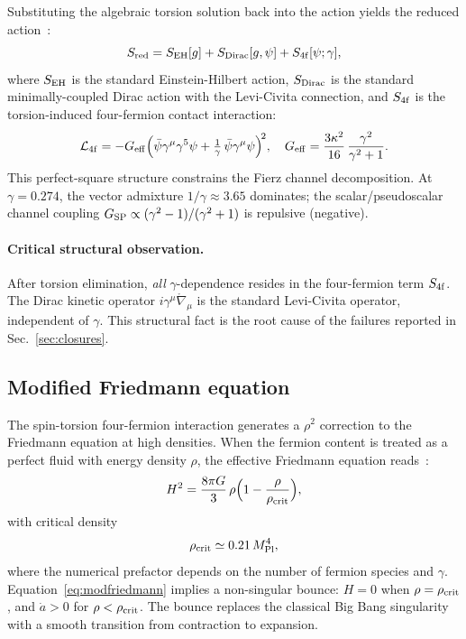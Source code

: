 \documentclass[aps,prd,twocolumn,superscriptaddress,showpacs,preprintnumbers,
  nofootinbib,longbibliography,floatfix]{revtex4-2}
\newcommand{\rhocrit}{\rho_{\rm crit}}
\newcommand{\MPl}{M_{\rm Pl}}
\newcommand{\BI}{\gamma}
\newcommand{\Geff}{G_{\rm eff}}
\newcommand{\Gsp}{G_{\rm SP}}
\begin{document}
Substituting the algebraic torsion solution back into the action yields
the reduced action~\cite{Freidel2005,ShapiroTeixeira2014}:
\begin{equation}\label{eq:Sreduced}
  S_{\rm red} = S_{\rm EH}[g] + S_{\rm Dirac}[g,\psi]
  + S_{\rm 4f}[\psi;\BI],
\end{equation}
where $S_{\rm EH}$ is the standard Einstein-Hilbert action,
$S_{\rm Dirac}$ is the standard minimally-coupled Dirac action with
the Levi-Civita connection, and $S_{\rm 4f}$ is the torsion-induced
four-fermion contact interaction:
\begin{equation}\label{eq:L4f}
  \mathcal{L}_{\rm 4f}
  = -\Geff\Bigl(\bar\psi\gamma^\mu\gamma^5\psi
    + \tfrac{1}{\BI}\,\bar\psi\gamma^\mu\psi\Bigr)^{\!2},
  \quad
  \Geff = \frac{3\kappa^2}{16}\,\frac{\BI^2}{\BI^2+1}.
\end{equation}
This perfect-square structure constrains the Fierz channel decomposition.
At $\BI = 0.274$, the vector admixture $1/\BI \approx 3.65$ dominates;
the scalar/pseudoscalar channel coupling
$\Gsp \propto (\BI^2 - 1)/(\BI^2 + 1)$ is repulsive (negative).

\paragraph{Critical structural observation.}
After torsion elimination, \textit{all} $\BI$-dependence resides in the
four-fermion term $S_{\rm 4f}$. The Dirac kinetic operator
$i\gamma^\mu\mathring\nabla_\mu$ is the standard Levi-Civita operator,
independent of $\BI$. This structural fact is the root cause of the
failures reported in Sec.~\ref{sec:closures}.

\subsection{Modified Friedmann equation}\label{sec:friedmann}

The spin-torsion four-fermion interaction generates a $\rho^2$ correction
to the Friedmann equation at high densities. When the fermion content is
treated as a perfect fluid with energy density $\rho$, the effective
Friedmann equation reads~\cite{Poplawski2012}:
\begin{equation}\label{eq:modfriedmann}
  H^2 = \frac{8\pi G}{3}\,\rho\Bigl(1 - \frac{\rho}{\rhocrit}\Bigr),
\end{equation}
with critical density
\begin{equation}\label{eq:rhocrit}
  \rhocrit \simeq 0.21\,\MPl^4,
\end{equation}
where the numerical prefactor depends on the number of fermion species and
$\BI$. Equation~\eqref{eq:modfriedmann} implies a non-singular bounce:
$H=0$ when $\rho = \rhocrit$, and $\dot{a} > 0$ for $\rho < \rhocrit$.
The bounce replaces the classical Big Bang singularity with a smooth
transition from contraction to expansion.
\end{document}
